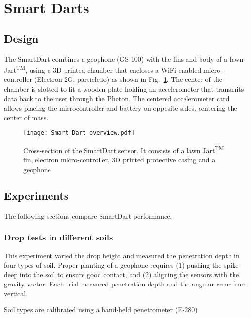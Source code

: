 \section{Smart Darts}\label{sec:SmartDarts}

\subsection{Design}

The SmartDart combines a geophone (GS-100) with the fins and body of a lawn Jart\textsuperscript{TM}, using a 3D-printed chamber that encloses a WiFi-enabled micro-controller (Electron 2G, particle.io) as shown in Fig.~\ref{fig:Smart_Dart_overview}. 
The center of the chamber is slotted to fit a wooden plate holding an accelerometer that transmits data back to the user through the Photon. 
The centered accelerometer card allows placing the microcontroller and battery on opposite sides, centering the center of mass.



\begin{figure} \centering
{\texttt{[image: Smart\_Dart\_overview.pdf]}}
\caption{Cross-section of the SmartDart sensor. It consists of a lawn  Jart\textsuperscript{TM} fin, electron micro-controller, 3D printed protective casing and a geophone} 
\label{fig:Smart_Dart_overview}
\end{figure}

\subsection{Experiments}
The following sections compare SmartDart performance.
\subsubsection{ Drop tests in different soils} 
This experiment varied the drop height and measured the penetration depth in four types of soil.
Proper planting of a geophone requires (1) pushing the spike deep into the soil to ensure good contact, and (2) aligning the sensors with the gravity vector.
Each trial measured penetration depth and the angular error from vertical.

Soil types are calibrated using a hand-held penetrometer (E-280)


